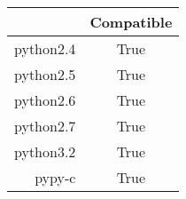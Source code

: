 \begin{table}[ht]
	\begin{center}
	\label{tab:compatibleTable}
		\begin{tabular}{rc}
		\toprule
			 & Compatible\\
			\midrule
			python2.4 & True\\
			python2.5 & True\\
			python2.6 & True\\
			python2.7 & True\\
			python3.2 & True\\
			pypy-c & True\\
		\bottomrule
		\end{tabular}
	\end{center}
\end{table}